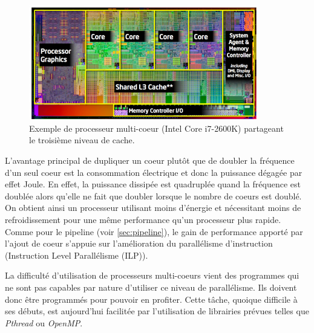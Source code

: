 \begin{figure}
    \center
    \includegraphics[width=10cm]{images/cpu_multicore.jpg}
    \caption{\label{processeur_archi} Exemple de processeur multi-coeur (Intel Core i7-2600K)  partageant le troisième niveau de cache.\protect\footnotemark}
\end{figure}




L’avantage principal de dupliquer un coeur plutôt que de doubler la fréquence d’un seul coeur est la consommation électrique et donc la puissance dégagée par effet Joule. En effet, la puissance dissipée est quadruplée quand la fréquence est doublée alors qu'elle ne fait que doubler lorsque le nombre de coeurs est doublé. On obtient ainsi un processeur utilisant moins d’énergie et nécessitant moins de refroidissement pour une même performance qu'un processeur plus rapide.
Comme pour le pipeline (voir \autoref{sec:pipeline}), le gain de performance apporté par l’ajout de coeur s’appuie sur l’amélioration du parallélisme d'instruction (Instruction Level Parallélisme (ILP)).


La difficulté d’utilisation de processeurs multi-coeurs vient des programmes qui ne sont pas capables par nature d’utiliser ce niveau de parallélisme. Ils doivent donc être programmés pour pouvoir en profiter. Cette tâche, quoique difficile à ses débuts, est aujourd'hui facilitée par l’utilisation de librairies prévues telles que \textit{Pthread} ou \textit{OpenMP}. 

